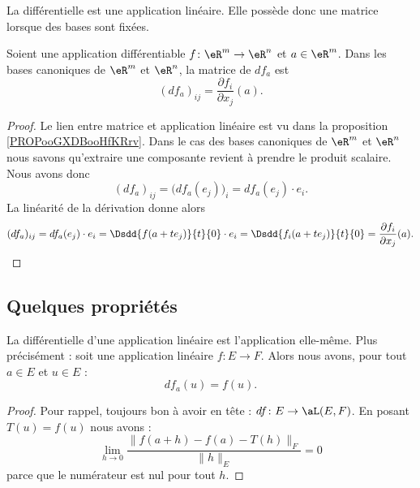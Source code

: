 La différentielle est une application linéaire. Elle possède donc une matrice lorsque des bases sont fixées.
\begin{proposition}     \label{PROPooBMROooThgLuU}
	Soient une application différentiable \( f\colon \eR^m\to \eR^n\) et \( a\in \eR^m\). Dans les bases canoniques de \( \eR^m\) et \( \eR^n\), la matrice de \( df_a\) est
	\begin{equation}
		(df_a)_{ij}=\frac{ \partial f_i }{ \partial x_j }(a).
	\end{equation}
\end{proposition}

\begin{proof}
	Le lien entre matrice et application linéaire est vu dans la proposition \ref{PROPooGXDBooHfKRrv}. Dans le cas des bases canoniques de \( \eR^m\) et \( \eR^n\) nous savons qu'extraire une composante revient à prendre le produit scalaire. Nous avons donc
	\begin{equation}
		(df_a)_{ij}=\big( df_a(e_j) \big)_i=df_a(e_j)\cdot e_i.
	\end{equation}
	La linéarité de la dérivation donne alors
	\begin{equation}
		(df_a)_{ij}=df_a(e_j)\cdot e_i=\Dsdd{ f(a+te_j) }{t}{0}\cdot e_i=\Dsdd{ f_i(a+te_j) }{t}{0}=\frac{ \partial f_i }{ \partial x_j }(a).
	\end{equation}
\end{proof}

\subsection{Quelques propriétés}

\begin{lemma}       \label{LEMooZSNMooCfjzOB}
	La différentielle d'une application linéaire est l'application elle-même. Plus précisément : soit une application linéaire \( f\colon E\to F\). Alors nous avons, pour tout \( a\in E\) et \( u\in E\) :
	\begin{equation}
		df_a(u)=f(u).
	\end{equation}
\end{lemma}

\begin{proof}
	Pour rappel, toujours bon à avoir en tête : \( df\colon E\to \aL(E,F)\). En posant \( T(u)=f(u)\) nous avons :
	\begin{equation}
		\lim_{h\to 0} \frac{ \| f(a+h)-f(a)- T(h) \|_F }{ \| h \|_E }=0
	\end{equation}
	parce que le numérateur est nul pour tout \( h\).
\end{proof}


